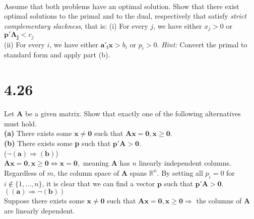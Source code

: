 \documentclass{article}
\begin{document}
\begin{Parallel}[v]{0.5\textwidth}{0.2\textwidth}
\ParallelPar
\end{Parallel}


\noindent \\
Assume that both problems have an optimal solution.  Show that there exist optimal solutions to the primal and to the dual, respectively that satisfy \emph{strict complementary slackness}, that is:
(i) For every $j$, we have either $x_j > 0$ or $\mathbf{p'A_j} < c_j$ \\
(ii) For every $i$, we have either $\mathbf{a'_i x} > b_i$ or $p_i > 0$.  \emph{Hint:} Convert the primal to standard form and apply part (b). \\

\section*{4.26} 
Let $\mathbf{A}$ be a given matrix.  Show that exactly one of the following alternatives must hold.\\

\noindent
\textbf{(a)} There exists some $\mathbf{x \neq 0}$ such that $\mathbf{Ax = 0, x \geq 0}$.\\
\textbf{(b)} There exists some \textbf{p} such that $\mathbf{p'A > 0}$. \\

\noindent
($\mathbf{\neg (a) \Rightarrow (b)}$) \\
\noindent
$\mathbf{Ax = 0, x \geq 0} \Leftrightarrow \mathbf{x = 0},$  meaning $\mathbf{A}$ has $n$ linearly independent columns.  Regardless of $m$, the column space of $\mathbf{A}$ spans $\mathbb{R}^n$.  By setting all $p_i = 0$ for $i \notin \{1, \dots, n\}$, it is clear that we can find a vector $\mathbf{p}$ such that $\mathbf{p'A > 0}$. \\

\noindent
$(\mathbf{(a) \Rightarrow \neg (b)})$ \\
Suppose there exists some $\mathbf{x \neq 0}$ such that $\mathbf{Ax = 0, x \geq 0} \Rightarrow $  the columns of $\mathbf{A}$ are linearly dependent.
\end{document}
